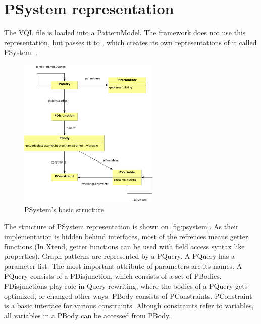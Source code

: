 \section{PSystem representation}


The VQL file is loaded into a PatternModel. 
The framework does not use this representation, but passes it to \viatra, which creates its own representations of it called PSystem. \cite{psystem}. 


\begin{figure}[H]
	\begin{center}
		\includegraphics[width=0.6\textwidth]{figures/psystem.pdf}
		\caption{PSystem's basic structure}
		\label{fig:psystem}
	\end{center}
\end{figure}

The structure of PSystem representation is shown on \autoref{fig:psystem}. 
As their implementation is hidden behind interfaces, most of the refrences means getter functions (In Xtend, getter functions can be used with field access syntax like \csharp{} properties). 
Graph patterns are represented by a PQuery. 
A PQuery has a parameter list. 
The most important attribute of parameters are its names. 
A PQuery consists of a PDisjunction, which consists of a set of PBodies. 
PDisjunctions play role in Query rewriting, where the bodies of a PQuery gets optimized, or changed other ways.
PBody consists of PConstraints. 
PConstraint is a basic interface for various constraints. 
Altough constraints refer to variables, all variables in a PBody can be accessed from PBody.




